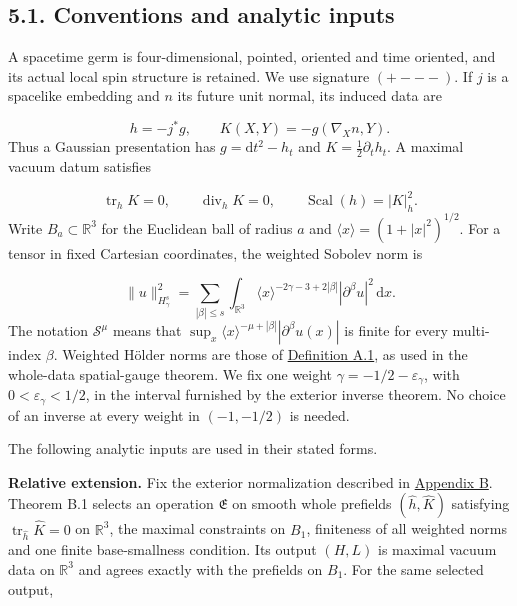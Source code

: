 \documentclass[
  english,
  11pt,
  reqno]{amsart}
\begin{document}
\subsection{5.1. Conventions and analytic
inputs}\label{conventions-and-analytic-inputs}\label{sec:submission-coverage-conventions}

A spacetime germ is four-dimensional, pointed, oriented and time
oriented, and its actual local spin structure is retained. We use
signature \((+---)\). If \(j\) is a spacelike embedding and \(n\) its
future unit normal, its induced data are

\label{eq:submission-coverage-induced-data} \[
h=-j^*g,
\qquad
K(X,Y)=-g(\nabla_Xn,Y).
\] Thus a Gaussian presentation has \(g=\mathrm dt^2-h_t\) and
\(K=\tfrac12\partial_t h_t\). A maximal vacuum datum satisfies

\label{eq:submission-coverage-maximal-constraints} \[
\operatorname{tr}_hK=0,
\qquad
\operatorname{div}_hK=0,
\qquad
\operatorname{Scal}(h)=|K|_h^2.
\] Write \(B_a\subset\mathbb R^3\) for the Euclidean ball of radius
\(a\) and \(\langle x\rangle=(1+|x|^2)^{1/2}\). For a tensor in fixed
Cartesian coordinates, the weighted Sobolev norm is

\label{eq:submission-coverage-weighted-norm} \[
\|u\|_{H^s_\gamma}^2
=
\sum_{|\beta|\le s}
\int_{\mathbb R^3}
\langle x\rangle^{-2\gamma-3+2|\beta|}
|\partial^\beta u|^2\,\mathrm dx.
\] The notation \(\mathscr S^\mu\) means that
\(\sup_x\langle x\rangle^{-\mu+|\beta|}|\partial^\beta u(x)|\) is finite
for every multi-index \(\beta\). Weighted Hölder norms are those of
\hyperref[def:online-weighted-holder-chart-spaces]{Definition A.1}, as
used in the whole-data spatial-gauge theorem. We fix one weight
\(\gamma=-1/2-\varepsilon_\gamma\), with \(0<\varepsilon_\gamma<1/2\),
in the interval furnished by the exterior inverse theorem. No choice of
an inverse at every weight in \((-1,-1/2)\) is needed.

The following analytic inputs are used in their stated forms.

\textbf{Relative extension.} Fix the exterior normalization described in
\hyperref[app:online-relative-extension]{Appendix B}. Theorem B.1
selects an operation \(\mathfrak E\) on smooth whole prefields
\((\widehat h,\widehat K)\) satisfying
\(\operatorname{tr}_{\widehat h}\widehat K=0\) on \(\mathbb R^3\), the
maximal constraints on \(B_1\), finiteness of all weighted norms and one
finite base-smallness condition. Its output \((H,L)\) is maximal vacuum
data on \(\mathbb R^3\) and agrees exactly with the prefields on
\(B_1\). For the same selected output,
\end{document}
